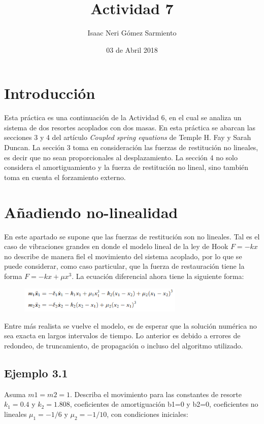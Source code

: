 \documentclass[a4paper]{article}
\title{Actividad 7}
\author{Isaac Neri Gómez Sarmiento}
\date{03 de Abril 2018}
\begin{document}
\maketitle

\section{Introducción}

Esta práctica es una continuación de la Actividad 6, en el cual se analiza un sistema de dos resortes acoplados con dos masas. En esta práctica se abarcan las secciones 3 y 4 del artículo \textit{Coupled spring equations} de Temple H. Fay y Sarah Duncan. 
La sección 3 toma en consideración las fuerzas de restitución no lineales, es decir que no sean proporcionales al desplazamiento. 
La sección 4 no solo considera el amortiguamiento y la fuerza de restitución no lineal, sino también toma en cuenta el forzamiento externo.

\section{Añadiendo no-linealidad}
En este apartado se supone que las fuerzas de restitución son no lineales. Tal es el caso de vibraciones grandes en donde el modelo lineal de la ley de Hook $F=-kx$ no describe de manera fiel el movimiento del sistema acoplado, por lo que se puede considerar, como caso particular, que la fuerza de restauración tiene la forma $F=-kx+\mu x^3$. La ecuación diferencial ahora tiene la siguiente forma:

\begin{figure}[ht!]
\centering
\includegraphics[width=0.7\textwidth]{nonlinearity_eq.PNG}
\end{figure}

Entre más realista se vuelve el modelo, es de esperar que la solución numérica no sea exacta en largos intervalos de tiempo. Lo anterior es debido a errores de redondeo, de truncamiento, de propagación o incluso del algoritmo utilizado. 


\subsection{Ejemplo 3.1}
Asuma $m1=m2=1$. Describa el movimiento para las constantes de resorte $k_1=0.4$ y $k_2=1.808$, coeficientes de amortiguación b1=0 y b2=0, coeficientes no lineales $\mu_1=-1/6$ y $\mu_2=-1/10$, con condiciones iniciales:
\end{document}
